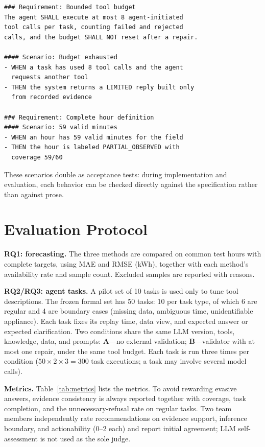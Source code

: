 \documentclass[conference]{IEEEtran}
\begin{document}
\begin{lstlisting}
### Requirement: Bounded tool budget
The agent SHALL execute at most 8 agent-initiated
tool calls per task, counting failed and rejected
calls, and the budget SHALL NOT reset after a repair.

#### Scenario: Budget exhausted
- WHEN a task has used 8 tool calls and the agent
  requests another tool
- THEN the system returns a LIMITED reply built only
  from recorded evidence

### Requirement: Complete hour definition
#### Scenario: 59 valid minutes
- WHEN an hour has 59 valid minutes for the field
- THEN the hour is labeled PARTIAL_OBSERVED with
  coverage 59/60
\end{lstlisting}

These scenarios double as acceptance tests: during implementation and
evaluation, each behavior can be checked directly against the
specification rather than against prose.

\section{Evaluation Protocol}
\label{sec:eval}

\textbf{RQ1: forecasting.} The three methods are compared on common
test hours with complete targets, using MAE and RMSE (kWh), together
with each method's availability rate and sample count. Excluded samples
are reported with reasons.

\textbf{RQ2/RQ3: agent tasks.} A pilot set of 10 tasks is used only to
tune tool descriptions. The frozen formal set has 50 tasks: 10 per task
type, of which 6 are regular and 4 are boundary cases (missing data,
ambiguous time, unidentifiable appliance). Each task fixes its replay
time, data view, and expected answer or expected clarification. Two
conditions share the same LLM version, tools, knowledge, data, and
prompts: \textbf{A}---no external validation; \textbf{B}---validator
with at most one repair, under the same tool budget. Each task is run
three times per condition ($50\times2\times3=300$ task executions; a
task may involve several model calls).

\textbf{Metrics.} Table~\ref{tab:metrics} lists the metrics. To avoid
rewarding evasive answers, evidence consistency is always reported
together with coverage, task completion, and the unnecessary-refusal
rate on regular tasks. Two team members independently rate
recommendations on evidence support, inference boundary, and
actionability (0--2 each) and report initial agreement; LLM
self-assessment is not used as the sole judge.
\end{document}
